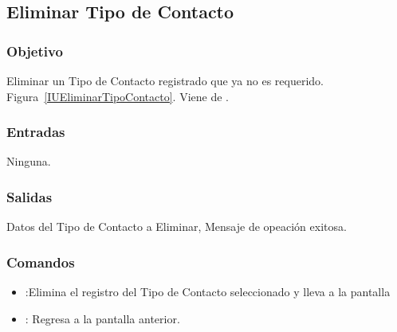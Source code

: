 
\subsection{Eliminar Tipo de Contacto}
\subsubsection{Objetivo}
Eliminar un Tipo de Contacto registrado que ya no es requerido. Figura~\ref{IUEliminarTipoContacto}. Viene de .



\subsubsection{Entradas}
Ninguna.

\subsubsection{Salidas}
Datos del Tipo de Contacto a Eliminar, Mensaje de opeación exitosa.



\subsubsection{Comandos}
\begin{itemize}
 \item {}:Elimina el registro del Tipo de Contacto seleccionado y lleva a la pantalla  
 \item {}: Regresa a la pantalla anterior.
\end{itemize}




